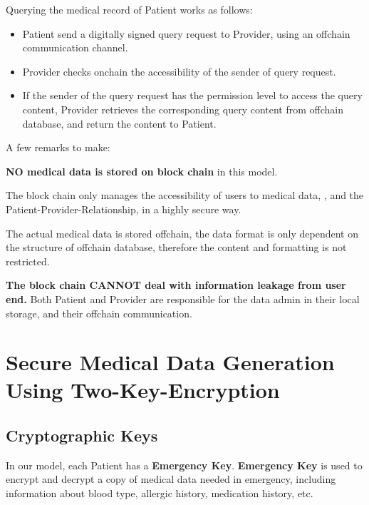\documentclass[]{scrartcl}
\theoremstyle{definition}
\begin{document}
Querying the medical record of Patient works as follows:

\begin{itemize}
\item Patient send a digitally signed query request to Provider, using an offchain communication channel.

\item Provider checks onchain the accessibility of the sender of query request.

\item If the sender of the query request has the permission level to access the query content, Provider retrieves the corresponding query content from offchain database, and return the content to Patient.
\end{itemize}	

A few remarks to make:
\begin{list}{}{}
	\item \textbf{NO medical data is stored on block chain} in this model.
	
	\item The block chain only manages the accessibility of users to medical data, , and the Patient-Provider-Relationship, in a highly secure way. 
	
	\item The actual medical data is stored offchain, the data format is only dependent on the structure of offchain database, therefore the content and formatting is not restricted.
	
	\item \textbf{The block chain CANNOT deal with information leakage from user end.} Both Patient and Provider are responsible for the data admin in their local storage, and their offchain communication. 
\end{list}

\section{Secure Medical Data Generation Using Two-Key-Encryption}

\subsection{Cryptographic Keys}
In our model, each Patient has a \textbf{Emergency Key}. \textbf{Emergency Key} is used to encrypt and decrypt a copy of medical data needed in emergency, including information about blood type, allergic history, medication history, etc. 
\end{document}
